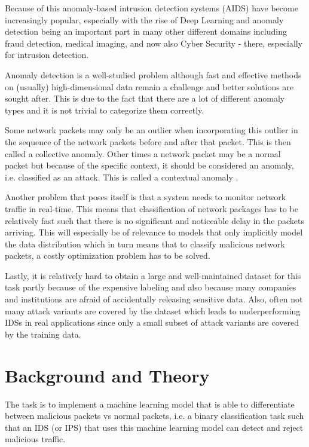 \documentclass[]{article}
\begin{document}
Because of this anomaly-based intrusion detection systems (AIDS) have become increasingly popular, especially with the rise of Deep Learning and anomaly detection being an important part in many other different domains including fraud detection, medical imaging, and now also Cyber Security - there, especially for intrusion detection. 
\newline

\noindent
Anomaly detection is a well-studied problem although fast and effective methods on (usually) high-dimensional data remain a challenge and better solutions are sought after.  This is due to the fact that there are a lot of different anomaly types and it is not trivial to categorize them correctly. 

Some network packets may only be an outlier when incorporating this outlier in the sequence of the network packets before and after that packet. This is then called a collective anomaly. Other times a network packet may be a normal packet but because of the specific context, it should be considered an anomaly, i.e. classified as an attack. This is called a contextual anomaly \cite{10.1145/1541880.1541882}. 
\newline

\noindent
Another problem that poses itself is that a system needs to monitor network traffic in real-time. This means that classification of network packages has to be relatively fast such that there is no significant and noticeable delay in the packets arriving. This will especially be of relevance to models that only implicitly model the data distribution which in turn means that to classify malicious network packets, a costly optimization problem has to be solved.
\newline

\noindent
Lastly, it is relatively hard to obtain a large and well-maintained dataset for this task partly because of the expensive labeling and also because many companies and institutions are afraid of accidentally releasing sensitive data. Also, often not many attack variants are covered by the dataset which leads to underperforming IDSs in real applications since only a small subset of attack variants are covered by the training data. 
	
	
	\section{Background and Theory}

	
	 The task is to implement a machine learning model that is able to differentiate between malicious packets vs normal packets, i.e. a binary classification task such that an IDS (or IPS) that uses this machine learning model can detect and reject malicious traffic. 
\end{document}
